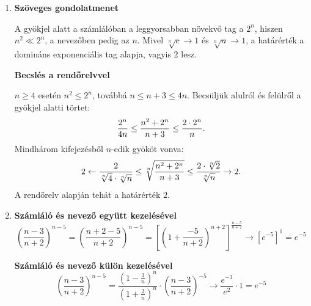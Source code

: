 \documentclass[11pt]{scrartcl}
\begin{document}
\begin{enumerate}
	\item \textbf{Szöveges gondolatmenet}

	      A gyökjel alatt a számlálóban a leggyorsabban növekvő tag a $2^n$,
	      hiszen $n^2 \ll 2^n$, a nevezőben pedig az $n$. Mivel
	      $\sqrt[n]{c} \to 1$ és $\sqrt[n]{n} \to 1$, a határérték a domináns
	      exponenciális tag alapja, vagyis $2$ lesz.

	      \textbf{Becslés a rendőrelvvel}

	      $n \ge 4$ esetén $n^2 \le 2^n$, továbbá $n \le n + 3 \le 4n$.
	      Becsüljük alulról és felülről a gyökjel alatti törtet:
	      \[
		      \frac{2^n}{4n}
		      \le \frac{n^2 + 2^n}{n + 3}
		      \le \frac{2 \cdot 2^n}{n}
		      \text.
	      \]
	      Mindhárom kifejezésből $n$-edik gyököt vonva:
	      \[
		      2
		      \leftarrow \frac{2}{\sqrt[n]{4} \cdot \sqrt[n]{n}}
		      \le \sqrt[n]{\frac{n^2 + 2^n}{n + 3}}
		      \le \frac{2 \cdot \sqrt[n]{2}}{\sqrt[n]{n}}
		      \to 2
		      \text.
	      \]
	      A rendőrelv alapján tehát a határérték $2$.

	\item \textbf{Számláló és nevező együtt kezelésével}
	      \[
		      \left( \frac{n - 3}{n + 2} \right)^{n - 5}
		      = \left( \frac{n + 2 - 5}{n + 2} \right)^{n - 5}
		      = \left[
			      \left( 1 + \frac{-5}{n + 2} \right)^{n + 2}
			      \right]^{\frac{n - 5}{n + 2}}
		      \to \left[e^{-5}\right]^{1} = e^{-5}
	      \]

	      \textbf{Számláló és nevező külön kezelésével}
	      \[
		      \left( \frac{n - 3}{n + 2} \right)^{n - 5}
		      = \frac{\left(1 - \frac{3}{n}\right)^n}{\left(1 + \frac{2}{n}\right)^n}
		      \cdot \left( \frac{n - 3}{n + 2} \right)^{-5}
		      \to \frac{e^{-3}}{e^{2}} \cdot 1
		      = e^{-5}
	      \]
\end{enumerate}
\end{document}

